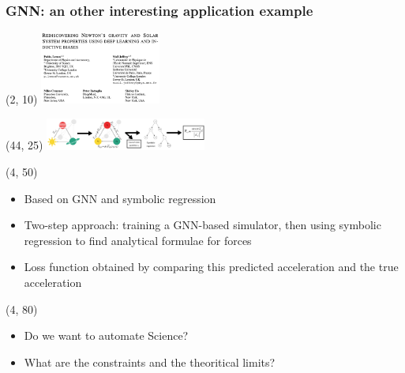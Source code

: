 \begin{frame}
  \frametitle{GNN: an other interesting application example}
  \begin{textblock}{40}(2, 10)
    \includegraphics[width=150px]{img/retrieve_gravitation_laws_1.png}
  \end{textblock}
  \begin{textblock}{56}(44, 25)
    \includegraphics[width=200px]{img/retrieve_gravitation_laws_2.png}
  \end{textblock}
  \begin{textblock}{80}(4, 50)
    \begin{itemize}
      \item Based on GNN and symbolic regression
      \item Two-step approach: training a GNN-based simulator, then using symbolic regression to find analytical formulae for forces
      \item Loss function obtained by comparing this predicted acceleration and the true acceleration
    \end{itemize}
  \end{textblock}


  \begin{textblock}{80}(4, 80)
    \begin{itemize}
      \item Do we want to automate Science? 
      \item What are the constraints and the theoritical limits? 
    \end{itemize}
  \end{textblock}

\end{frame}
